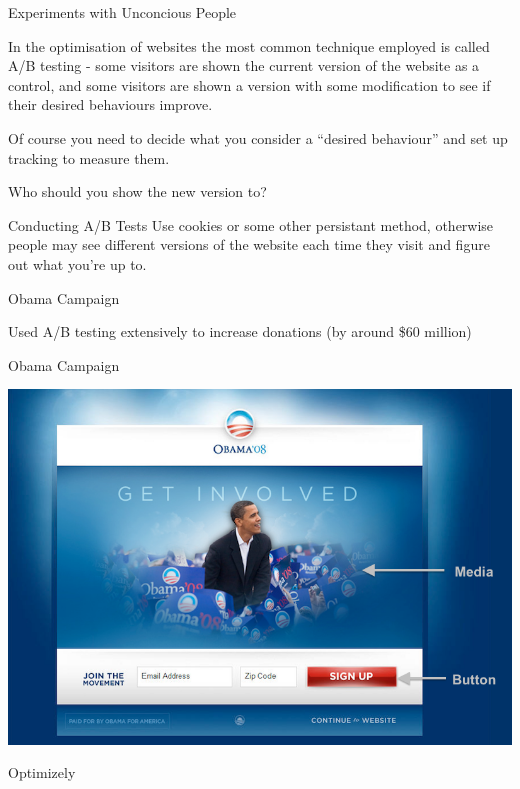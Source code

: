 \documentclass{beamer}
\begin{document}
\begin{frame}{Experiments with Unconcious People}

In the optimisation of websites the most common technique employed is called A/B testing - some visitors are shown the current version of the website as a control, and some visitors are shown a version with some modification to see if their desired behaviours improve. 

\vspace{5mm}

Of course you need to decide what you consider a ``desired behaviour'' and set up tracking to measure them.  

\vspace{5mm}

Who should you show the new version to?  %

\end{frame}




\begin{frame}{Conducting A/B Tests}
Use cookies or some other persistant method, otherwise people may see different versions of the website each time they visit and figure out what you're up to.
\end{frame}


\begin{frame}{Obama Campaign}

Used A/B testing extensively to increase donations (by around \$60 million)

\end{frame}



\begin{frame}{Obama Campaign}

\begin{center}
\includegraphics[scale=0.35]{pics/wk6/Obama_Homepage_original.png}
\end{center}

Optimizely

\end{frame}
\end{document}
